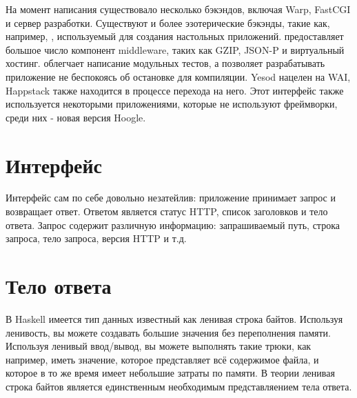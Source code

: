 На момент написания существовало несколько бэкэндов, включая Warp, FastCGI и
сервер разработки. Существуют и более эзотерические бэкэнды, такие как, например,
,
используемый для создания настольных приложений.  предоставляет большое число компонент middleware, таких как  GZIP, JSON-P
и виртуальный хостинг. 
облегчает написание модульных тестов, а  позволяет разрабатывать приложение не беспокоясь об остановке для компиляции.
Yesod нацелен на WAI, Happstack также находится в процессе перехода на него.
Этот интерфейс также используется некоторыми приложениями, которые не используют фреймворки, среди
них - новая версия Hoogle.


\section {Интерфейс}

Интерфейс сам по себе довольно незатейлив: приложение принимает запрос и возвращает
ответ. Ответом является статус HTTP, список заголовков и тело ответа.
Запрос содержит различную информацию: запрашиваемый путь, строка запроса, тело запроса,
версия HTTP и т.д.

\section {Тело ответа}

В Haskell имеется тип данных известный как ленивая строка байтов. Используя ленивость,
вы можете создавать большие значения без переполнения памяти. Используя ленивый ввод/вывод,
вы можете выполнять такие трюки, как например, иметь значение, которое представляет всё 
содержимое файла, и которое в то же время имеет небольшие затраты по памяти. В теории
ленивая строка байтов является единственным необходимым представляением тела ответа.

